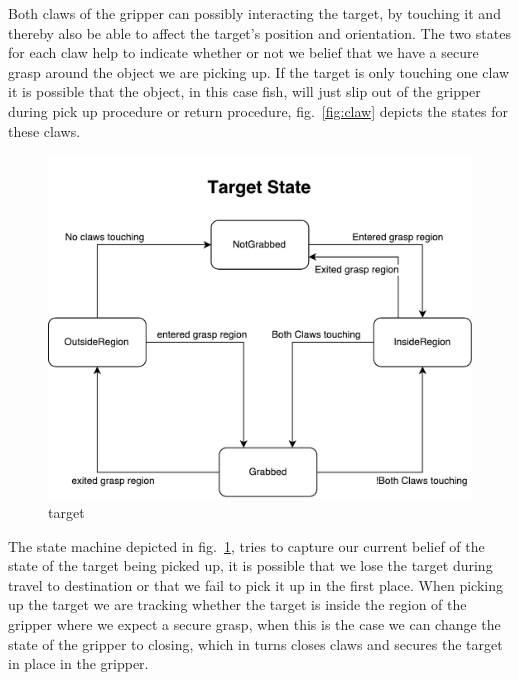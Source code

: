 Both claws of the gripper can possibly interacting the target, by touching it and thereby also be able to affect the target's position and orientation. The two states for each claw help to indicate whether or not we belief that we have a secure grasp around the object we are picking up. If the target is only touching one claw it is possible that the object, in this case fish, will just slip out of the gripper during pick up procedure or return procedure, fig.~\ref{fig:claw} depicts the states for these claws.

\begin{figure}
\centering
\includegraphics[width=.8\linewidth]{figures/statediagrams/target.pdf}
\caption{target}
\label{fig:target}
\end{figure}

The state machine depicted in fig.~\ref{fig:target}, tries to capture our current belief of the state of the target being picked up, it is possible that we lose the target during travel to destination or that we fail to pick it up in the first place. When picking up the target we are tracking whether the target is inside the region of the gripper where we expect a secure grasp, when this is the case we can change the state of the gripper to closing, which in turns closes claws and secures the target in place in the gripper.